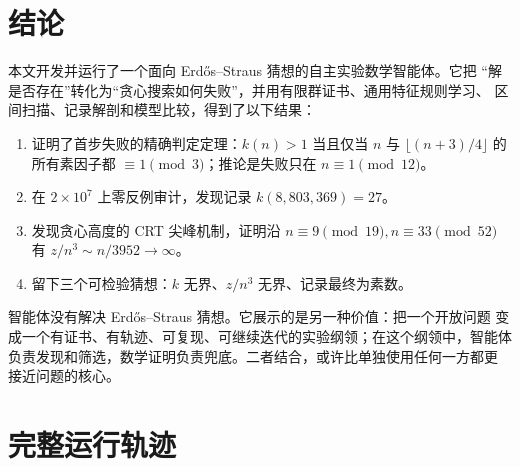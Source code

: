 \documentclass[11pt,a4paper]{ctexart}
\theoremstyle{definition}
\theoremstyle{remark}
\begin{document}
\section{结论}

本文开发并运行了一个面向 Erdős--Straus 猜想的自主实验数学智能体。它把
“解是否存在”转化为“贪心搜索如何失败”，并用有限群证书、通用特征规则学习、
区间扫描、记录解剖和模型比较，得到了以下结果：
\begin{enumerate}
\item 证明了首步失败的精确判定定理：$k(n)>1$ 当且仅当 $n$ 与
$\lfloor(n+3)/4\rfloor$ 的所有素因子都 $\equiv1\pmod3$；推论是失败只在
$n\equiv1\pmod{12}$。
\item 在 $2\times10^7$ 上零反例审计，发现记录 $k(8{,}803{,}369)=27$。
\item 发现贪心高度的 CRT 尖峰机制，证明沿
$n\equiv9\pmod{19},n\equiv33\pmod{52}$ 有
$z/n^3\sim n/3952\to\infty$。
\item 留下三个可检验猜想：$k$ 无界、$z/n^3$ 无界、记录最终为素数。
\end{enumerate}

智能体没有解决 Erdős--Straus 猜想。它展示的是另一种价值：把一个开放问题
变成一个有证书、有轨迹、可复现、可继续迭代的实验纲领；在这个纲领中，智能体
负责发现和筛选，数学证明负责兜底。二者结合，或许比单独使用任何一方都更
接近问题的核心。

\appendix
\newpage

\section{完整运行轨迹}
\end{document}
